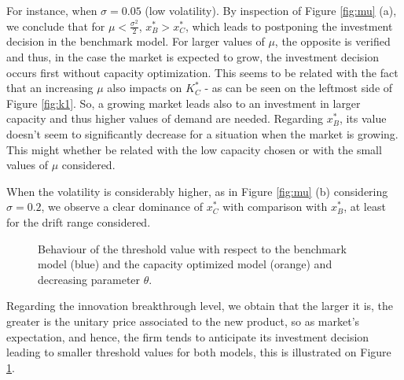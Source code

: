 For instance, when $\sigma=0.05$ (low volatility). By inspection of Figure  \ref{fig:mu} (a), we conclude that for $\mu<\frac{\sigma^2}{2}$, $x^*_B>x^*_C$, which leads to postponing the investment decision in the benchmark model. For larger values of $\mu$, the opposite is verified and thus, in the case the market is expected to grow, the investment decision occurs first without capacity optimization. This seems to be related with the fact that an increasing $\mu$ also impacts on $K_C^*$ - as can be seen on the leftmost side of Figure \ref{fig:k1}. So, a growing market leads also to an investment in larger capacity and thus higher values of demand are needed. Regarding $x^*_B$, its value doesn't seem to significantly decrease for a situation when the market is growing. This might whether be related with the low capacity chosen or with the small values of $\mu$ considered.

When the volatility is considerably higher, as in Figure \ref{fig:mu} (b) considering $\sigma=0.2$, we observe a clear dominance of $x^*_C$ with comparison with $x^*_B$, at least for the drift range considered.







\begin{figure}[!htb]
	\centering
	\caption{Behaviour of the threshold value with respect to the benchmark model (blue) and the capacity optimized model (orange) and decreasing parameter $\theta$.}
	\label{fig:td}
\end{figure}

Regarding the innovation breakthrough level, we obtain that the larger it is, the greater is the unitary price associated to the new product, so as market's expectation, and hence, the firm tends to anticipate its investment decision leading to smaller threshold values for both models, this is illustrated on Figure \ref{fig:td}.




